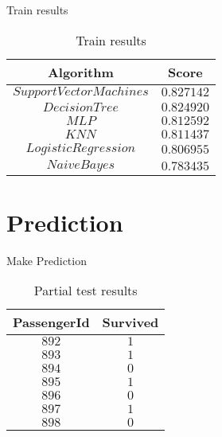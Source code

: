 \documentclass[
size=14pt,
paper=smartboard,  %
mode=present, 		%
display=slides, 	%
style=tuliplab,  	%
pauseslide,
fleqn,leqno]{powerdot}
\begin{document}
	\begin{slide}{Train results}
		\begin{table}[htbp]
			\setlength{\abovecaptionskip}{0pt}
			\setlength{\belowcaptionskip}{10pt}
			\centering
			\caption{Train results}
			\begin{tabular}{ c | c }
				\toprule
				Algorithm & Score  \\
				\midrule
				$Support Vector Machines$
				&  {$0.827142$}\\
				$Decision Tree$
				&  {$0.824920$}\\
				$MLP$
				&  {$0.812592$}\\
				$KNN$
				&  {$0.811437$}\\
				$Logistic Regression$
				&  {$0.806955$}\\
				$Naive Bayes $
				&  {$0.783435$}\\
				\bottomrule	
			\end{tabular}
		\end{table}
	\end{slide}
	
	
	\section{Prediction}
	
	\begin{slide}[toc=,bm=]{Make Prediction}
		
		\begin{table}[htbp]
			\setlength{\abovecaptionskip}{1pt}
			\setlength{\belowcaptionskip}{3pt}
			\centering
			\caption{Partial test results}
			\begin{tabular}{ c | c }
				\toprule
				PassengerId & Survived  \\
				\midrule
				$892$
				&  {$1$}\\
				$893$
				&  {$1$}\\
				$894$
				&  {$0$}\\
				$895$
				&  {$1$}\\
				$896$
				&  {$0$}\\
				$897$
				&  {$1$}\\
				$898$
				&  {$0$}\\
				
				\bottomrule	
			\end{tabular}
		\end{table}
	\end{slide}
	
\end{document}
